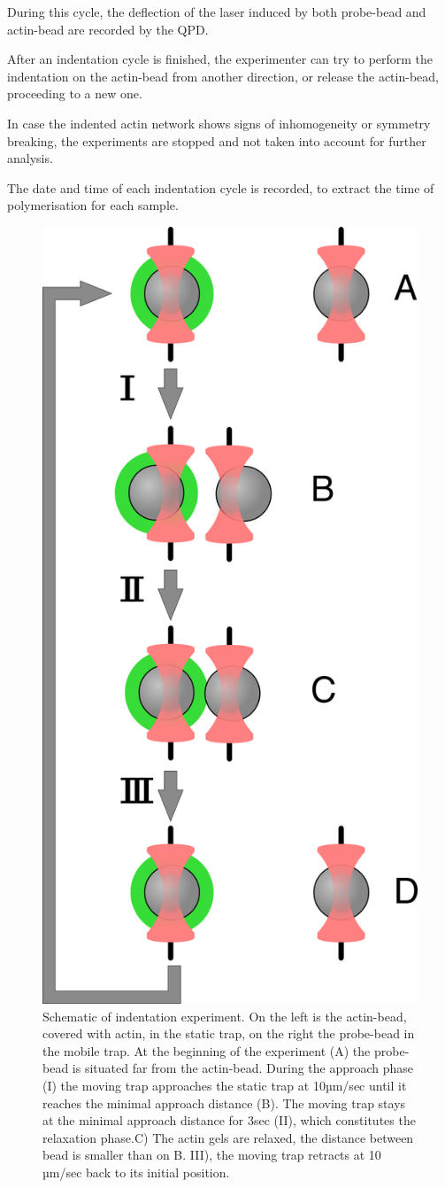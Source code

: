 \documentclass[A4paperpaper,11pt,english]{sphinxmanual}
\begin{document}
During this cycle, the deflection of the laser induced by both probe-bead and
actin-bead are recorded by the QPD.

After an indentation cycle is finished, the experimenter can try to perform the
indentation on the actin-bead from another direction, or release the actin-bead,
proceeding to a new one.

In case the indented actin network shows signs of inhomogeneity or
symmetry breaking, the experiments are stopped and not taken into account for
further analysis.

The date and time of each indentation cycle is recorded, to extract the time of
polymerisation for each sample.
\begin{figure}[htbp]
\centering
\capstart

\includegraphics[width=0.500\linewidth]{beed_move.png}
\caption{Schematic of indentation experiment. On the left is the actin-bead, covered
with actin, in the static trap, on the right the probe-bead in the mobile
trap. At the beginning of the experiment (A) the probe-bead is situated far from
the actin-bead. During the approach phase (I) the moving trap approaches
the static trap at 10µm/sec until it reaches the minimal approach
distance (B). The moving trap stays at the minimal approach distance for
3sec (II), which constitutes the relaxation phase.C) The actin gels are
relaxed, the distance between bead is smaller than on B. III), the moving
trap retracts at 10 µm/sec back to its initial position.}\label{parts/part2:bead-move}\end{figure}
\end{document}
